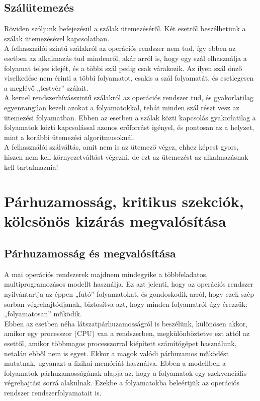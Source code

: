 \documentclass[tikz,12pt,margin=0px]{article}
\begin{document}
	\subsection*{Szálütemezés}

    \noindent Röviden szóljunk befejezésül a szálak ütemezéséről. Két esetről beszélhetünk a szálak ütemezésével kapcsolatban.\\

    \noindent A felhasználói szintű szálakról az operációs rendszer nem tud, így ebben az esetben az alkalmazás tud mindenről, akár arról is, hogy egy szál elhasználja a folyamat teljes idejét, és a többi szál pedig csak várakozik. Az ilyen szál önző viselkedése nem érinti a többi folyamatot, csakis a szál folyamatát, és esetlegesen a meglévő „testvér” szálait.\\

    \noindent A kernel rendszerhívásszintű szálakról az operációs rendszer tud, és gyakorlatilag egyenrangúan kezeli azokat a folyamatokkal, tehát minden szál részt vesz az ütemezési folyamatban. Ebben az esetben a szálak közti kapcsolás gyakorlatilag a folyamatok közti kapcsolással azonos erőforrást igényel, és pontosan az a helyzet, mint a korábbi ütemezési algoritmusoknál.\\

    \noindent A felhasználói szálváltás, amit nem is az ütemező végez, ehhez képest gyors, hiszen nem kell környezetváltást végezni, de ezt az ütemezést az alkalmazásnak kell tartalmaznia!

\newpage
	\section*{Párhuzamosság, kritikus szekciók, kölcsönös kizárás megvalósítása}
	
	\subsection*{Párhuzamosság és megvalósítása}
	
    A mai operációs rendszerek majdnem mindegyike a többfeladatos, multiprogramozásos modellt használja. Ez azt jelenti, hogy az operációs rendszer nyilvántartja az éppen „futó” folyamatokat, és gondoskodik arról, hogy ezek szép sorban végrehajtódjanak, biztosítva azt, hogy minden folyamatról úgy érezzük: „folyamatosan” működik.\\

    \noindent Ebben az esetben néha látszatpárhuzamosságról is beszélünk, különösen akkor, amikor egy processzor (CPU) van a rendszerben, megkülönböztetve ezt attól az esettől, amikor többmagos processzorral kiépített számítógépet használunk, netalán ebből nem is egyet. Ekkor a magok valódi párhuzamos működést mutatnak, ugyanazt a fizikai memóriát használva. Ebben a modellben a folyamatok párhuzamosságának alapja az, hogy a folyamatok egy szekvenciális végrehajtási sorrá alakulnak. Ezekbe a folyamatokba beleértjük az operációs rendszer rendszerfolyamatait is.\\
\end{document}
